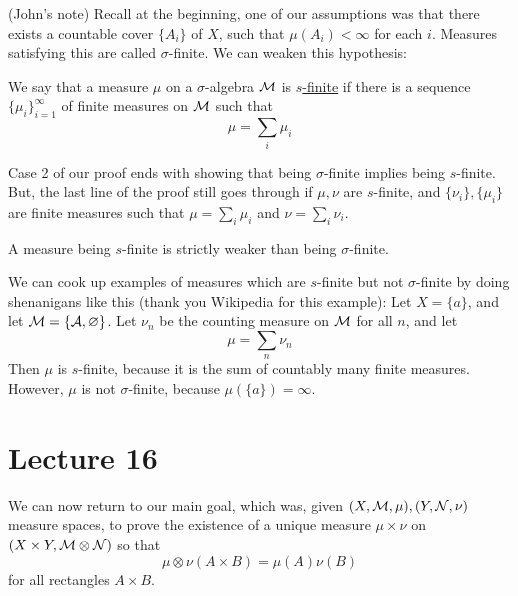 \documentclass[x11names,reqno,14pt]{extarticle}
\newcommand*{\oo}{\infty}
\newcommand{\seq}[1]{_{#1 = 1}^\oo}
\begin{document}
\rem (John's note) Recall at the beginning, one of our assumptions was that there exists a countable cover $\{A_i\}$ of $X$, such that $\mu(A_i) < \oo$ for each $i$. Measures satisfying this are called $\sigma$-finite. We can weaken this hypothesis:


We say that a measure $\mu$ on a $\sigma$-algebra $\mathcal{M}$ is \underline{$s$-finite} if there is a sequence $\{\mu_i\}\seq{i}$ of finite measures on $\mathcal{M}$ such that
\[
\mu=\sum_i\mu_i
\]

Case 2 of our proof ends with showing that being $\sigma$-finite implies being $s$-finite. But, the last line of the proof still goes through if $\mu, \nu$ are $s$-finite, and $\{\nu_i\}, \{\mu_i\}$ are finite measures such that $\mu = \sum_i\mu_i$ and $\nu = \sum_i\nu_i$. 

\rem A measure being $s$-finite is strictly weaker than being $\sigma$-finite. 

\exm

We can cook up examples of measures which are $s$-finite but not $\sigma$-finite by doing shenanigans like this (thank you Wikipedia for this example): Let $X = \{a\}$, and let $\mathcal{M} = \{\mathcal{A}, \varnothing\}$. Let $\nu_n$ be the counting measure on $\mathcal{M}$ for all $n$, and let 
\[
\mu = \sum_n\nu_n
\]
Then $\mu$ is $s$-finite, because it is the sum of countably many finite measures. However, $\mu$ is not $\sigma$-finite, because $\mu(\{a\}) = \oo$. 

\section*{Lecture 16}

We can now return to our main goal, which was, given $(X, \mathcal{M}, \mu), (Y, \mathcal{N}, \nu)$ measure spaces, to prove the existence of a unique measure $\mu\times\nu$ on $(X\times Y, \mathcal{M}\otimes\mathcal{N})$ so that
\[
\mu\otimes\nu(A\times B) = \mu(A)\nu(B)
\]
for all rectangles $A\times B$. 

\end{document}
